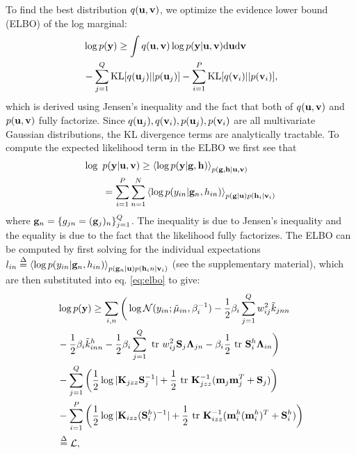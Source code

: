 \noindent
To find the best distribution $q(\mathbf{u}, \mathbf{v})$, we  optimize the evidence lower bound (ELBO) of the log marginal:
\begin{align}
\nonumber
&\log p(\mathbf{y}) \ge \int q(\mathbf{u}, \mathbf{v}) \log p(\mathbf{y} | \mathbf{u}, \mathbf{v})  \mathrm{d} \mathbf{u} \mathrm{d} \mathbf{v} \\
&- \sum_{j=1}^Q \text{KL}[q(\mathbf{u}_j) || p(\mathbf{u}_j)] - \sum_{i=1}^P \text{KL}[q(\mathbf{v}_i) || p(\mathbf{v}_i)],
\label{eq:elbo}
\end{align}
which is derived using Jensen's inequality and the fact that both of $q(\mathbf{u}, \mathbf{v})$ and $p(\mathbf{u}, \mathbf{v})$ fully factorize.
Since $q(\mathbf{u}_j), q(\mathbf{v}_i), p(\mathbf{u}_j), p(\mathbf{v}_i)$ are all multivariate Gaussian distributions, the KL divergence terms are analytically tractable. To compute the expected likelihood term in the ELBO we first see that
\begin{align}
\nonumber
\log \text{ } &p(\mathbf{y} | \mathbf{u}, \mathbf{v})
\ge \left\langle \log p(\mathbf{y} | \mathbf{g}, \mathbf{h}) \right\rangle_{p(\mathbf{g},\mathbf{h} | \mathbf{u}, \mathbf{v})}  \\
&= \sum_{i=1}^P \sum_{n=1}^N \left\langle \log p(y_{in} | \mathbf{g}_n, h_{in})  \right\rangle_{p(\mathbf{g} | \mathbf{u}) p(\mathbf{h}_i | \mathbf{v}_i)} 
\end{align}
where $\mathbf{g}_n = \{g_{jn} = (\mathbf{g}_j)_n\}_{j=1}^Q$.
The inequality is due to Jensen's inequality and the equality is due to the fact that the likelihood fully factorizes.
\newcommand{\Ahi}{\A^h_i}
\newcommand{\Zi}{\Z_i}
The ELBO can be computed by first solving for the individual expectations 
$l_{in} \overset{\Delta}{=} \left\langle \log p(y_{in} | \mathbf{g}_n, h_{in})  \right\rangle_{p(\mathbf{g}_n | \mathbf{u}) p(\mathbf{h}_in | \mathbf{v}_i)}$ (see the supplementary material), which are then substituted into eq. \ref{eq:elbo} to give:
\begin{align}
\nonumber
&\log p(\mathbf{y})
\ge \sum_{i,n}
\bigg( \log  \mathcal{N}(y_{in}; \tilde{\mu}_{in}, \beta_i^{-1})
          - \frac{1}{2} \beta_i \sum_{j=1}^Q w_{ij}^2 \tilde{k}_{jnn} \\ \nonumber
         &- \frac{1}{2} \beta_i \tilde{k}^h_{inn}
         - \frac{1}{2} \beta_i \sum_{j=1}^Q \mbox{ \rm tr } w_{ij}^2 \mathbf{S}_j \mathbf{\Lambda}_{jn} - \beta_i \frac{1}{2} \mbox{ \rm tr } \mathbf{S}^h_i \mathbf{\Lambda}_{in} 
\bigg) \\
\nonumber
& - \sum_{j=1}^Q \bigg( \frac{1}{2} \log |\mathbf{K}_{jzz} \mathbf{S}_j^{-1}| + \frac{1}{2} \mbox{ \rm tr } \mathbf{K}_{jzz}^{-1}  (\mathbf{m}_j \mathbf{m}_j^T + \mathbf{S}_j)\bigg) \\
\nonumber
& - \sum_{i=1}^P  \bigg( \frac{1}{2} \log |\mathbf{K}_{izz}(\mathbf{S}^h_i)^{-1}| + \frac{1}{2} \mbox{ \rm tr } \mathbf{K}_{izz}^{-1} (\mathbf{m}^h_i (\mathbf{m}^h_i)^T + \mathbf{S}^h_i) \bigg) \\
  &\overset{\Delta}{=} \mathcal{L},
  \label{eq:L}
\end{align}

